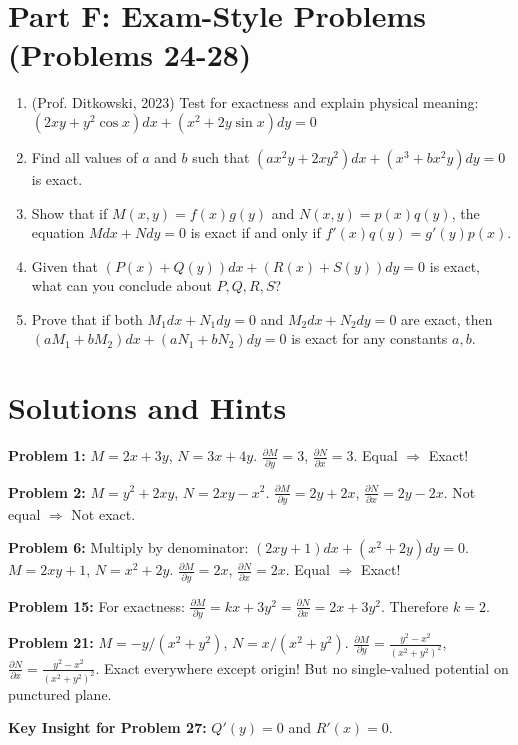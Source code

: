 \documentclass[12pt]{article}
\begin{document}
\section*{Part F: Exam-Style Problems (Problems 24-28)}

\begin{enumerate}[start=24]
\item (Prof. Ditkowski, 2023) Test for exactness and explain physical meaning:
$(2xy + y^2\cos x)dx + (x^2 + 2y\sin x)dy = 0$

\item Find all values of $a$ and $b$ such that
$(ax^2y + 2xy^2)dx + (x^3 + bx^2y)dy = 0$ is exact.

\item Show that if $M(x,y) = f(x)g(y)$ and $N(x,y) = p(x)q(y)$, the equation
$Mdx + Ndy = 0$ is exact if and only if $f'(x)q(y) = g'(y)p(x)$.

\item Given that $(P(x) + Q(y))dx + (R(x) + S(y))dy = 0$ is exact, what can you conclude about $P, Q, R, S$?

\item Prove that if both $M_1dx + N_1dy = 0$ and $M_2dx + N_2dy = 0$ are exact, then $(aM_1 + bM_2)dx + (aN_1 + bN_2)dy = 0$ is exact for any constants $a, b$.
\end{enumerate}

\section*{Solutions and Hints}

\textbf{Problem 1:} $M = 2x + 3y$, $N = 3x + 4y$.
$\frac{\partial M}{\partial y} = 3$, $\frac{\partial N}{\partial x} = 3$.
Equal $\Rightarrow$ Exact!

\textbf{Problem 2:} $M = y^2 + 2xy$, $N = 2xy - x^2$.
$\frac{\partial M}{\partial y} = 2y + 2x$, $\frac{\partial N}{\partial x} = 2y - 2x$.
Not equal $\Rightarrow$ Not exact.

\textbf{Problem 6:} Multiply by denominator: $(2xy + 1)dx + (x^2 + 2y)dy = 0$.
$M = 2xy + 1$, $N = x^2 + 2y$.
$\frac{\partial M}{\partial y} = 2x$, $\frac{\partial N}{\partial x} = 2x$.
Equal $\Rightarrow$ Exact!

\textbf{Problem 15:} For exactness: $\frac{\partial M}{\partial y} = kx + 3y^2 = \frac{\partial N}{\partial x} = 2x + 3y^2$.
Therefore $k = 2$.

\textbf{Problem 21:} $M = -y/(x^2+y^2)$, $N = x/(x^2+y^2)$.
$\frac{\partial M}{\partial y} = \frac{y^2-x^2}{(x^2+y^2)^2}$,
$\frac{\partial N}{\partial x} = \frac{y^2-x^2}{(x^2+y^2)^2}$.
Exact everywhere except origin! But no single-valued potential on punctured plane.

\textbf{Key Insight for Problem 27:} $Q'(y) = 0$ and $R'(x) = 0$.
\end{document}
